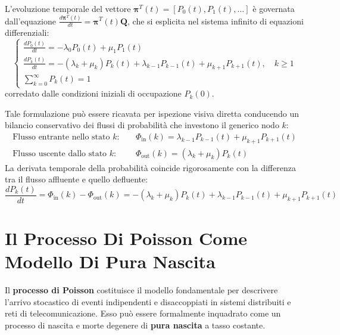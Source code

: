 \documentclass[11pt, a4paper]{article}
\begin{document}
L'evoluzione temporale del vettore $\bm{\pi}^T(t) = [P_0(t), P_1(t), \dots]$ è governata dall'equazione $\frac{d\bm{\pi}^T(t)}{dt} = \bm{\pi}^T(t)\bm{Q}$, che si esplicita nel sistema infinito di equazioni differenziali:
\begin{equation}
    \begin{cases}
        \displaystyle \frac{dP_0(t)}{dt} = -\lambda_0 P_0(t) + \mu_1 P_1(t) \\[10pt]
        \displaystyle \frac{dP_k(t)}{dt} = -(\lambda_k + \mu_k)P_k(t) + \lambda_{k-1}P_{k-1}(t) + \mu_{k+1}P_{k+1}(t), \quad k \ge 1 \\[10pt]
        \displaystyle \sum_{k=0}^{\infty} P_k(t) = 1
    \end{cases}
\end{equation}
corredato dalle condizioni iniziali di occupazione $P_k(0)$.


Tale formulazione può essere ricavata per ispezione visiva diretta conducendo un bilancio conservativo dei flussi di probabilità che investono il generico nodo $k$:
\begin{align*}
    \text{Flusso entrante nello stato } k: \quad &\Phi_{\text{in}}(k) = \lambda_{k-1}P_{k-1}(t) + \mu_{k+1}P_{k+1}(t) \\
    \text{Flusso uscente dallo stato } k: \quad &\Phi_{\text{out}}(k) = (\lambda_k + \mu_k)P_k(t)
\end{align*}
La derivata temporale della probabilità coincide rigorosamente con la differenza tra il flusso affluente e quello defluente:
\[
    \boxed{\frac{dP_k(t)}{dt} = \Phi_{\text{in}}(k) - \Phi_{\text{out}}(k) = -(\lambda_k + \mu_k)P_k(t) + \lambda_{k-1}P_{k-1}(t) + \mu_{k+1}P_{k+1}(t)}
\]

\newpage


\section{Il Processo Di Poisson Come Modello Di Pura Nascita}

Il \textbf{processo di Poisson} costituisce il modello fondamentale per descrivere l'arrivo stocastico di eventi indipendenti e disaccoppiati in sistemi distribuiti e reti di telecomunicazione. Esso può essere formalmente inquadrato come un processo di nascita e morte degenere di \textbf{pura nascita} a tasso costante.
\end{document}
